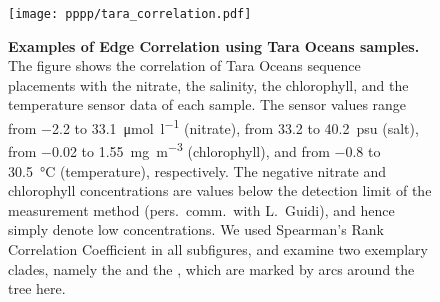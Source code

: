 \begin{figure}[!hpbt]
    \centering
    \texttt{[image: pppp/tara\_correlation.pdf]}
    \begin{subfigure}{0pt}
        \label{fig:tara_correlation:sub:nitrate}
    \end{subfigure}
    \begin{subfigure}{0pt}
        \label{fig:tara_correlation:sub:salinity}
    \end{subfigure}
    \begin{subfigure}{0pt}
        \label{fig:tara_correlation:sub:chlorophyll}
    \end{subfigure}
    \begin{subfigure}{0pt}
        \label{fig:tara_correlation:sub:temperature}
    \end{subfigure}
    \caption[Examples of Edge Correlation using Tara Oceans samples]{
        \textbf{Examples of Edge Correlation using Tara Oceans samples.}
        The figure shows the correlation of Tara Oceans sequence placements with
         the nitrate,
         the salinity,
         the chlorophyll, and
         the temperature sensor data of each sample.
        The sensor values range from \SI{-2.2}{} to \SI[per-mode=symbol]{33.1}{\micro\mole\per\litre} (nitrate),
        from \SI{33.2}{} to \SI{40.2}{psu} (salt),
        from \SI{-0.02}{} to \SI[per-mode=symbol]{1.55}{\milli\gram\per\cubic\metre} (chlorophyll), and
        from \SI{-0.8}{} to \SI{30.5}{\celsius} (temperature), respectively.
        The negative nitrate and chlorophyll concentrations are
        values below the detection limit of the measurement method (pers.~comm.~with L.~Guidi),
        and hence simply denote low concentrations.
        We used Spearman's Rank Correlation Coefficient in all subfigures,
        and examine two exemplary clades, namely the  and the ,
        which are marked by arcs around the tree here.
    }
    \label{fig:tara_correlation}
\end{figure}

